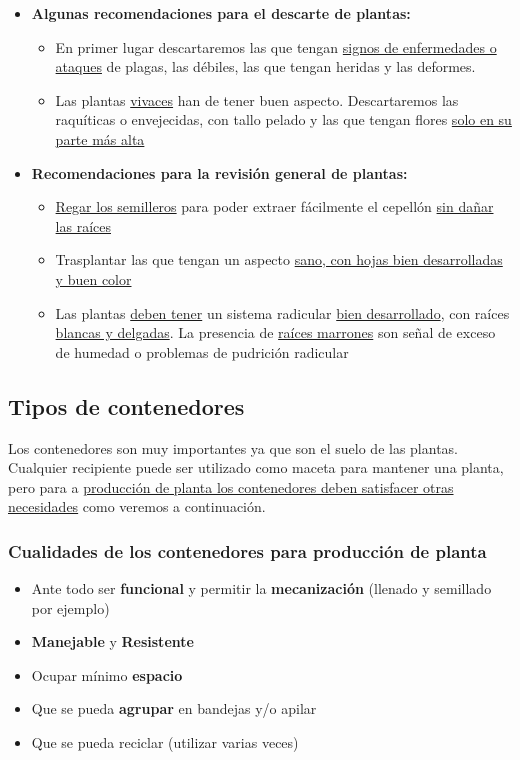 \documentclass[a4paper,12pt,oneside]{article}
\begin{document}
\begin{itemize}
\item \textbf{Algunas recomendaciones para el descarte de plantas:}
\begin{itemize}
\item En primer lugar descartaremos las que tengan \uline{signos de enfermedades o ataques}
de plagas, las débiles, las que tengan heridas y las deformes.
\item Las plantas \uline{vivaces} han de tener buen aspecto. Descartaremos las raquíticas
o envejecidas, con tallo pelado y las que tengan flores \uline{solo en su parte más
alta}
\end{itemize}

\item \textbf{Recomendaciones para la revisión general de plantas:}
\begin{itemize}
\item \uline{Regar los semilleros} para poder extraer fácilmente el cepellón \uline{sin dañar
las raíces}
\item Trasplantar las que tengan un aspecto \uline{sano, con hojas bien desarrolladas
y buen color}
\item Las plantas \uline{deben tener} un sistema radicular \uline{bien desarrollado}, con
raíces \uline{blancas y delgadas}. La presencia de \uline{raíces marrones} son señal de
exceso de humedad o problemas de pudrición radicular
\end{itemize}
\end{itemize}

\subsection{Tipos de contenedores}
\label{sec:org4ccbeb4}
Los contenedores son muy importantes ya que son el suelo de las
plantas. Cualquier recipiente puede ser utilizado como maceta para mantener una
planta, pero para a \uline{producción de planta los contenedores deben satisfacer
otras necesidades} como veremos a continuación.
\subsubsection{Cualidades de los contenedores para producción de planta}
\label{sec:orga745bc9}
\begin{itemize}
\item Ante todo ser \textbf{funcional} y permitir la \textbf{mecanización} (llenado y semillado
por ejemplo)
\item \textbf{Manejable} y \textbf{Resistente}
\item Ocupar mínimo \textbf{espacio}
\item Que se pueda \textbf{agrupar} en bandejas y/o apilar
\item Que se pueda reciclar (utilizar varias veces)
\end{itemize}
\end{document}
